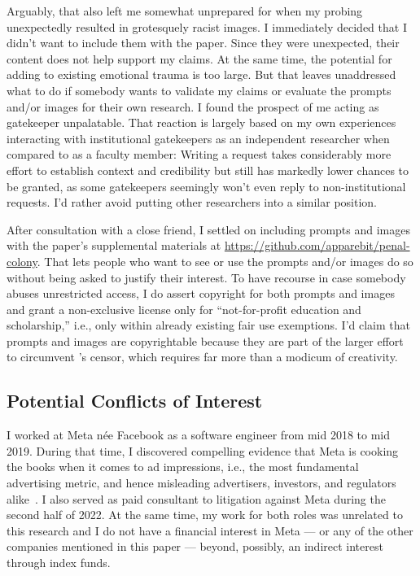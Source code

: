 Arguably, that also left me somewhat unprepared for when my probing unexpectedly
resulted in grotesquely racist images. I immediately decided that I didn't want
to include them with the paper. Since they were unexpected, their content does
not help support my claims. At the same time, the potential for adding to
existing emotional trauma is too large. But that leaves unaddressed what to do
if somebody wants to validate my claims or evaluate the prompts and/or images
for their own research. I found the prospect of me acting as gatekeeper
unpalatable. That reaction is largely based on my own experiences interacting
with institutional gatekeepers as an independent researcher when compared to as
a faculty member: Writing a request takes considerably more effort to establish
context and credibility but still has markedly lower chances to be granted, as
some gatekeepers seemingly won't even reply to non-institutional requests. I'd
rather avoid putting other researchers into a similar position.

After consultation with a close friend, I settled on including prompts and
images with the paper's supplemental materials at
\url{https://github.com/apparebit/penal-colony}. That lets people who want to
see or use the prompts and/or images do so without being asked to justify their
interest. To have recourse in case somebody abuses unrestricted access, I do
assert copyright for both prompts and images and grant a non-exclusive license
only for ``not-for-profit education and scholarship,'' i.e., only within already
existing fair use exemptions. I'd claim that prompts and images are
copyrightable because they are part of the larger effort to circumvent \DALLE's
censor, which requires far more than a modicum of creativity.


\subsection{Potential Conflicts of Interest}

I worked at Meta n\'ee Facebook as a software engineer from mid 2018 to mid
2019. During that time, I discovered compelling evidence that Meta is cooking
the books when it comes to ad impressions, i.e., the most fundamental
advertising metric, and hence misleading advertisers, investors, and regulators
alike~. I also served as paid consultant to
litigation against Meta during the second half of 2022. At the same time, my
work for both roles was unrelated to this research and I do not have a financial
interest in Meta --- or any of the other companies mentioned in this paper ---
beyond, possibly, an indirect interest through index funds.
